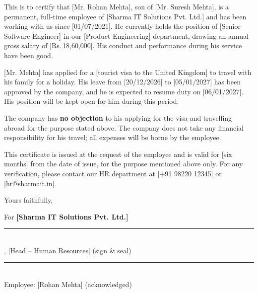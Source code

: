 \documentclass[10pt]{article}
\begin{document}
\vspace{12pt}

This is to certify that [Mr. Rohan Mehta], son of [Mr. Suresh Mehta], is a permanent, full-time employee of [Sharma IT Solutions Pvt. Ltd.] and has been working with us since [01/07/2021]. He currently holds the position of [Senior Software Engineer] in our [Product Engineering] department, drawing an annual gross salary of [Rs.\,18,60,000]. His conduct and performance during his service have been good.\par\vspace{4pt}

[Mr. Mehta] has applied for a [tourist visa to the United Kingdom] to travel with his family for a holiday. His leave from [20/12/2026] to [05/01/2027] has been approved by the company, and he is expected to resume duty on [06/01/2027]. His position will be kept open for him during this period.\par\vspace{4pt}

The company has \textbf{no objection} to his applying for the visa and travelling abroad for the purpose stated above. The company does not take any financial responsibility for his travel; all expenses will be borne by the employee.\par\vspace{4pt}

This certificate is issued at the request of the employee and is valid for [six months] from the date of issue, for the purpose mentioned above only. For any verification, please contact our HR department at [+91 98220 12345] or [hr@sharmait.in].\par\vspace{4pt}

\vspace{12pt}

Yours faithfully,\par\vspace{4pt}

For \textbf{[Sharma IT Solutions Pvt. Ltd.]}\par\vspace{4pt}

\vspace{2pt}

\vspace{32pt}\noindent\parbox[t]{0.3\linewidth}{\centering\rule{\linewidth}{0.5pt}\\ [Priya Nair], [Head -- Human Resources] (sign \& seal)}\hfill\parbox[t]{0.3\linewidth}{\centering\rule{\linewidth}{0.5pt}\\ Employee: [Rohan Mehta] (acknowledged)}\par
\end{document}
